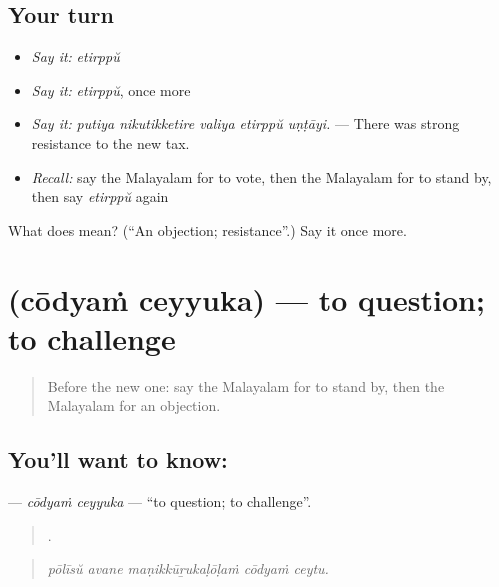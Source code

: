 \subsection*{Your turn}
\begin{itemize}
\raggedright
  \item \emph{Say it:} \emph{etirppŭ}
  \item \emph{Say it:} \emph{etirppŭ}, once more
  \item \emph{Say it:} \emph{putiya nikutikketire valiya etirppŭ uṇṭāyi.} — There was strong resistance to the new tax.
  \item \emph{Recall:} say the Malayalam for to vote, then the Malayalam for to stand by, then say \emph{etirppŭ} again
\end{itemize}

\begin{tcolorbox}[breakable,colback=teal!4,colframe=teal!35!black,title={Before you move on}]
What does  mean? (\textquotedblleft{}An objection; resistance\textquotedblright{}.) Say it once more.
\end{tcolorbox}
\section[\texorpdfstring{\ml{ചോദ്യം} \ml{ചെയ്യുക} (cōdyaṁ ceyyuka)}{ചോദ്യം ചെയ്യുക (cōdyaṁ ceyyuka)}]{  (cōdyaṁ ceyyuka) — to question; to challenge}

\label{lesson:ML-C453-codyam-ceyyuka}



\begin{quote}
Before the new one: say the Malayalam for to stand by, then the Malayalam for an objection.
\end{quote}

\subsection*{You'll want to know:  }
\textbf{ } — \emph{cōdyaṁ ceyyuka} — \textquotedblleft{}to question; to challenge\textquotedblright{}.

\begin{quote}
    .
\end{quote}

\begin{quote}
\emph{pōlīsŭ avane maṇikkūṟukaḷōḷaṁ cōdyaṁ ceytu.}
\end{quote}

